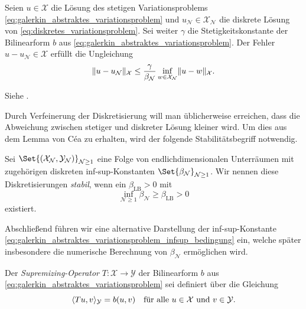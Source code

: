 \documentclass[../main.tex]{subfiles}
\begin{document}
\begin{Satz}\label{satz:lemma_von_cea}
    Seien $u \in \mathcal X$ die Lösung des stetigen Variationsproblems \cref{eq:galerkin_abstraktes_variationsproblem} und $u_{\mathcal N} \in \mathcal X_{\mathcal N}$ die diskrete Lösung von \cref{eq:diskretes_variationsproblem}.
    Sei weiter $\gamma$ die Stetigkeitskonstante der Bilinearform $b$ aus \cref{eq:galerkin_abstraktes_variationsproblem}.
    Der Fehler $u - u_{\mathcal N} \in \mathcal X$ erfüllt die Ungleichung
    \begin{equation}\label{eq:lemma_von_cea}
        \norm{u - u_{\mathcal N}}_{\mathcal X} \leq \frac{\gamma}{\beta_{\mathcal N}} \inf_{w \in \mathcal X_{\mathcal N}} \norm{u - w}_{\mathcal X}.
    \end{equation}

    \begin{Beweis}
        Siehe \cite[Theorem 3.2]{Nochetto:2009il}.
    \end{Beweis}
\end{Satz}

Durch Verfeinerung der Diskretisierung will man üblicherweise erreichen, dass die Abweichung zwischen stetiger und diskreter Lösung kleiner wird.
Um dies aus dem Lemma von Céa zu erhalten, wird der folgende Stabilitätsbegriff notwendig.

\begin{Definition}\label{definition:stabile_diskretisierung}
    Sei $\Set{(\mathcal X_{\mathcal N}, \mathcal Y_{\mathcal N})}_{\mathcal N \geq 1}$ eine Folge von endlichdimensionalen Unterräumen mit zugehörigen diskreten inf-sup-Konstanten $\Set{\beta_{\mathcal N}}_{\mathcal N \geq 1}$.
    Wir nennen diese Diskretisierungen \emph{stabil}, wenn ein $\beta_{\mathrm{LB}} > 0$ mit
    \begin{equation}
        \inf_{\mathcal N \geq 1} \beta_{\mathcal N} \geq \beta_{\mathrm{LB}} > 0
    \end{equation}
    existiert.
\end{Definition}

Abschließend führen wir eine alternative Darstellung der inf-sup-Konstante \cref{eq:galerkin_abstraktes_variationsproblem_infsup_bedingung} ein, welche später insbesondere die numerische Berechnung von $\beta_{\mathcal N}$ ermöglichen wird.

\begin{Definition}\label{definition:supremizing_operator}
    Der \emph{Supremizing-Operator} $T \colon \mathcal X \to \mathcal Y$ der Bilinearform $b$ aus \cref{eq:galerkin_abstraktes_variationsproblem} sei definiert über die Gleichung
    \begin{equation}
        \skp{Tu}{v}{\mathcal Y} = b(u, v) \quad \fa u \in \mathcal X \text{ und } v \in \mathcal Y.
    \end{equation}
\end{Definition}
\end{document}
